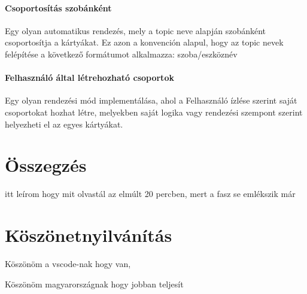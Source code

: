 \documentclass[
]{thesis-ekf}
\theoremstyle{definition}
\theoremstyle{remark}
\begin{document}
\subsubsection{Csoportosítás szobánként}
Egy olyan automatikus rendezés, mely a topic neve alapján szobánként csoportosítja a kártyákat.
Ez azon a konvención alapul, hogy az topic nevek felépítése a következő formátumot alkalmazza: szoba/eszköznév

\subsubsection{Felhasználó által létrehozható csoportok}
Egy olyan rendezési mód implementálása, ahol a Felhasználó ízlése szerint saját csoportokat hozhat létre, 
melyekben saját logika vagy rendezési szempont szerint helyezheti el az egyes kártyákat.

\chapter*{Összegzés}
itt leírom hogy mit olvastál az elmúlt 20 percben, mert a fasz se emlékszik már

\chapter*{Köszönetnyilvánítás}
\par
Köszönöm a vscode-nak hogy van,
\par
Köszönöm magyarországnak hogy jobban teljesít
\end{document}
